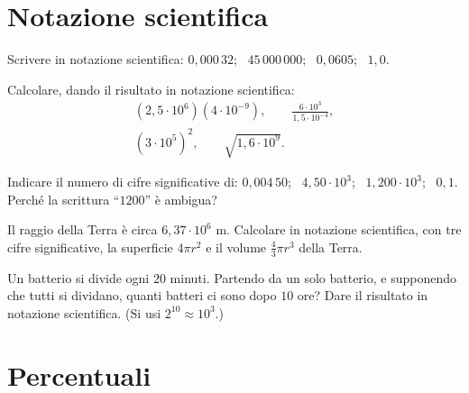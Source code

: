 \section{Notazione scientifica}

\begin{esercizio}[\liv{1}]
Scrivere in notazione scientifica: $0{,}000\,32$; \ $45\,000\,000$; \ $0{,}0605$; \ $1{,}0$.
\end{esercizio}

\begin{esercizio}[\liv{1}]
Calcolare, dando il risultato in notazione scientifica:
\begin{gather*}
(2{,}5\cdot10^{6})(4\cdot10^{-9}),\qquad \frac{6\cdot10^{3}}{1{,}5\cdot10^{-4}},\\
(3\cdot10^{5})^{2},\qquad \sqrt{1{,}6\cdot10^{9}}.
\end{gather*}
\end{esercizio}

\begin{esercizio}[\liv{1}]
Indicare il numero di cifre significative di: $0{,}004\,50$; \ $4{,}50\cdot10^{3}$; \ $1{,}200\cdot10^{3}$; \ $0{,}1$. Perch\'e la scrittura ``$1200$'' \`e ambigua?
\end{esercizio}

\begin{esercizio}[\liv{2}]
Il raggio della Terra \`e circa $6{,}37\cdot10^{6}$ m. Calcolare in notazione scientifica, con tre cifre significative, la superficie $4\pi r^{2}$ e il volume $\frac43\pi r^{3}$ della Terra.
\end{esercizio}

\begin{esercizio}[\liv{2}]
Un batterio si divide ogni $20$ minuti. Partendo da un solo batterio, e supponendo che tutti si dividano, quanti batteri ci sono dopo $10$ ore? Dare il risultato in notazione scientifica. (Si usi $2^{10}\approx10^{3}$.)
\end{esercizio}

\section{Percentuali}

